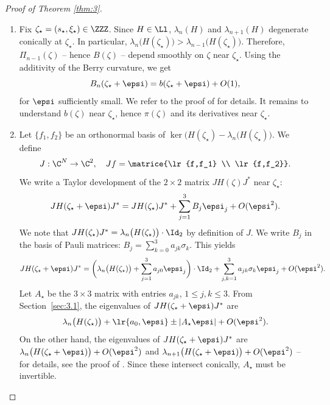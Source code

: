 \begin{proof}[Proof of Theorem \ref{thm:3}]
\begin{enumerate}
\item
Fix $\zeta_\star = (s_\star,\xi_\star) \in \ZZZ$. Since $H \in \Ll$, $\lambda_n(H)$ and $\lambda_{n+1}(H)$ degenerate conically at $\zeta_\star$. In particular, $\lambda_n\bigl(H(\zeta_\star)\bigr) > \lambda_{n-1}\bigl(H(\zeta_\star)\bigr)$. Therefore, $\Pi_{n-1}(\zeta)$ -- hence $B(\zeta)$ -- depend smoothly on $\zeta$ near $\zeta_\star$.
Using the additivity of the Berry curvature, we get
\begin{equation}\label{eq:0l}
B_n(\zeta_\star+\epsi) = b(\zeta_\star+\epsi) + O(1),
\end{equation}
for $\epsi$ sufficiently small. We refer to the proof of \cite[(2.21)]{D19b} for details. It remains to understand $b(\zeta)$ near $\zeta_\star$, hence $\pi(\zeta)$ and its derivatives near $\zeta_\star$.

\item
Let $\{f_1,f_2\}$ be an orthonormal basis of $\ker\bigl( H(\zeta_\star)-\lambda_n\bigl( H(\zeta_\star) \bigr)$. We define
\begin{equation*}
J : \C^N \to \C^2, \quad Jf = \matrice{\lr{f,f_1} \\ \lr{f,f_2}}.
\end{equation*}
We write a Taylor development of the $2 \times 2$ matrix $J H(\zeta) J^*$ near $\zeta_\star$:
\[
J H(\zeta_\star+\epsi) J^* = J H(\zeta_\star) J^* + \sum_{j=1}^3 B_j \epsi_j + O(\epsi^2).
\]
We note that $J H(\zeta_\star) J^* = \lambda_n\bigl( H(\zeta_\star) \bigr) \cdot \Id_2$ by definition of $J$.
We write $B_j$ in the basis of Pauli matrices: $B_j = \sum_{k=0}^3 a_{jk} \sigma_k$. This yields
\begin{equation}\label{eq:0i}
J H(\zeta_\star+\epsi) J^* = \biggl( \lambda_n\bigl( H(\zeta_\star) \bigr) + \sum_{j=1}^3 a_{j0} \epsi_j \biggr) \cdot \Id_2 + \sum_{j, k=1}^3 a_{jk} \sigma_k \epsi_j + O(\epsi^2).
\end{equation}
Let $A_\star$ be the $3 \times 3$ matrix with entries $a_{jk}$, $1 \leq j,k \leq 3$. From Section~\ref{sec:3.1}, the eigenvalues of $J H(\zeta_\star+\epsi) J^*$ are
\begin{equation}\label{eq:0r}
\lambda_n\bigl( H(\zeta_\star) \bigr) + \lr{a_0,\epsi} \pm |A_\star\epsi| + O(\epsi^2).
\end{equation}
On the other hand, the eigenvalues of $J H(\zeta_\star+\epsi) J^*$ are $\lambda_n\bigl(H(\zeta_\star+\epsi)\bigr) + O(\epsi^2)$ and $\lambda_{n+1}\bigl( H(\zeta_\star+\epsi)\bigr) + O(\epsi^2)$ -- for details, see the proof of \cite[(2.19)]{D19b}. Since these intersect conically, $A_\star$ must be invertible.


\end{enumerate}
\end{proof}
